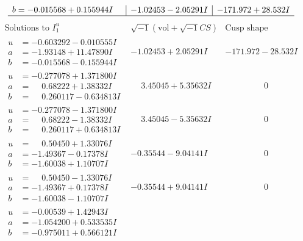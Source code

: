 \documentclass[1p]{elsarticle_modified}
\theoremstyle{definition}
\newcommand{\I}{\sqrt{-1}}
\begin{document}
$$\begin{array}{c|c|c}
\begin{aligned}
b &= -0.015568 + 0.155944 I\end{aligned}
 & -1.02453 - 2.05291 I & -171.972 + 28.532 I\\
 \hline 
 \end{array}$$\newpage$$\begin{array}{c|c|c}  
\text{Solutions to }I^u_{1}& \I (\text{vol} + \sqrt{-1}CS) & \text{Cusp shape}\\
 \hline 
\begin{aligned}
u &= -0.603292 - 0.010555 I \\
a &= -1.93148 + 11.47890 I \\
b &= -0.015568 - 0.155944 I\end{aligned}
 & -1.02453 + 2.05291 I & -171.972 - 28.532 I \\ \hline\begin{aligned}
u &= -0.277078 + 1.371800 I \\
a &= \phantom{-}0.68222 + 1.38332 I \\
b &= \phantom{-}0.260117 - 0.634813 I\end{aligned}
 & \phantom{-}3.45045 + 5.35632 I & \phantom{-0.000000 } 0 \\ \hline\begin{aligned}
u &= -0.277078 - 1.371800 I \\
a &= \phantom{-}0.68222 - 1.38332 I \\
b &= \phantom{-}0.260117 + 0.634813 I\end{aligned}
 & \phantom{-}3.45045 - 5.35632 I & \phantom{-0.000000 } 0 \\ \hline\begin{aligned}
u &= \phantom{-}0.50450 + 1.33076 I \\
a &= -1.49367 - 0.17378 I \\
b &= -1.60038 + 1.10707 I\end{aligned}
 & -0.35544 - 9.04141 I & \phantom{-0.000000 } 0 \\ \hline\begin{aligned}
u &= \phantom{-}0.50450 - 1.33076 I \\
a &= -1.49367 + 0.17378 I \\
b &= -1.60038 - 1.10707 I\end{aligned}
 & -0.35544 + 9.04141 I & \phantom{-0.000000 } 0 \\ \hline\begin{aligned}
u &= -0.00539 + 1.42943 I \\
a &= -1.054200 + 0.533535 I \\
b &= -0.975011 + 0.566121 I\end{aligned}

\end{array}$$
\end{document}
